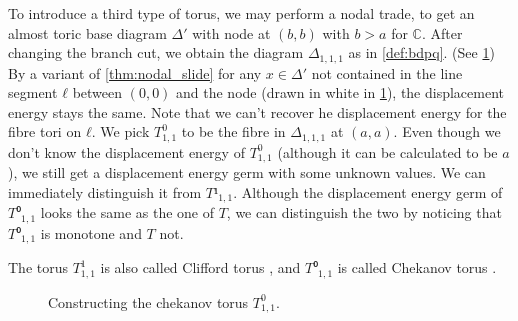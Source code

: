 \documentclass[12pt,a4paper,draft]{scrartcl}
\begin{document}
To introduce a third type of torus, we may perform a nodal trade, to get an almost toric base diagram $Δ'$ with node at $(b,b)$ with $b>a$ for $ℂ$.
After changing the branch cut, we obtain the diagram $Δ_{1,1,1}$ as in \cref{def:bdpq}. (See \cref{fig:babys_second_vd})
By a variant of \cref{thm:nodal_slide} for any $x ∈ Δ'$ not contained in the line segment $ℓ$ between $(0,0)$ and the node (drawn in white in \cref{fig:babys_second_vd}), the displacement energy stays the same.
Note that we can't recover he displacement energy for the fibre tori on $ℓ$.
We pick $T^0_{1,1}$ to be the fibre in $Δ_{1,1,1}$ at $(a,a)$.
Even though we don't know the displacement energy of $T^0_{1,1}$ (although it can be calculated to be $a$), we still get a displacement energy germ with some unknown values.
We can immediately distinguish it from $T¹_{1,1}$.
Although the displacement energy germ of $T⁰_{1,1}$ looks the same as the one of $T$, we can distinguish the two by noticing that $T⁰_{1,1}$ is monotone and $T$ not.

The torus $T^1_{1,1}$ is also called Clifford torus , and $T⁰_{1,1}$ is called Chekanov torus .

\begin{figure}
  \centering
  \caption{Constructing the chekanov torus $T^0_{1,1}$.}
  \label{fig:babys_second_vd}
\end{figure}
\end{document}
